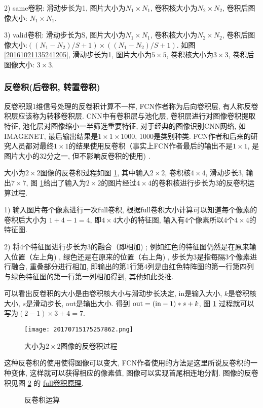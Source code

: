 2) same卷积: 滑动步长为1, 图片大小为$N_1\times N_1$, 卷积核大小为$N_2\times N_2$, 卷积后图像大小: $N_1\times N_1$.

3) valid卷积: 滑动步长为S, 图片大小为$N_1\times N_1$, 卷积核大小为$N_2\times N_2$, 卷积后图像大小:$((N_1-N_2)/S+1) \times ((N_1-N_2)/S+1)$.
如图 \ref{20161021135241205}, 滑动步长为1, 图片大小为$5\times 5$, 卷积核大小为$3\times 3$, 卷积后图像大小: $3\times 3$.

\subsubsection{反卷积(后卷积, 转置卷积)}

反卷积跟1维信号处理的反卷积计算不一样, FCN作者称为后向卷积层, 有人称反卷积层应该称为转移卷积层.
CNN中有卷积层与池化层, 卷积层进行对图像卷积提取特征, 池化层对图像缩小一半筛选重要特征, 对于经典的图像识别CNN网络, 如IMAGENET, 最后输出结果是$1\times 1\times 1000$, 1000是类别种类.
FCN作者和后来的研究人员都对最终$1\times 1$的结果使用反卷积（事实上FCN作者最后的输出不是$1\times 1$, 是图片大小的32分之一, 但不影响反卷积的使用) .
\begin{example}
大小为$2\times 2$图像的反卷积过程如图 \ref{20170715175257862}, 其中输入$2\times 2$, 卷积核$4\times 4$, 滑动步长3, 输出$7\times 7$, 图 \ref{20170715175257862}给出了输入为$2\times 2$的图片经过$4\times 4$的卷积核进行步长为3的反卷积运算过程.

1) 输入图片每个像素进行一次full卷积, 根据full卷积大小计算可以知道每个像素的卷积后大小为 $1+4-1=4$,  即$4\times 4$大小的特征图, 输入有4个像素所以4个$4\times 4$的特征图.

2) 将4个特征图进行步长为3的融合（即相加) ; 例如红色的特征图仍然是在原来输入位置（左上角) , 绿色还是在原来的位置（右上角) , 步长为3是指每隔3个像素进行融合, 重叠部分进行相加, 即输出的第1行第4列是由红色特阵图的第一行第四列与绿色特征图的第一行第一列相加得到, 其他如此类推.

可以看出反卷积的大小是由卷积核大小与滑动步长决定, in是输入大小, $k$是卷积核大小, $s$是滑动步长, out是输出大小.
得到 $\textup{out} = (\textup{in} - 1) * s + k$, 图 \ref{20170715175257862} 过程就可以写为$(2 - 1)\times 3 + 4 = 7$.
\begin{figure}[H]
\centering
\texttt{[image: 20170715175257862.png]}
\caption{大小为$2\times 2$图像的反卷积过程}
\label{20170715175257862}
\end{figure}
\vspace{-0.4cm}
\end{example}
这种反卷积的使用使得图像可以变大, FCN作者使用的方法是这里所说反卷积的一种变体, 这样就可以获得相应的像素值, 图像可以实现首尾相连地分割. 
图像的反卷积见图 \ref{Dconop0203} 的 \href{https://github.com/vdumoulin/conv_arithmetic}{full卷积原理}.
\begin{figure}[H]
\centering
{}
\caption{反卷积运算}
\label{Dconop0203}
\end{figure}
